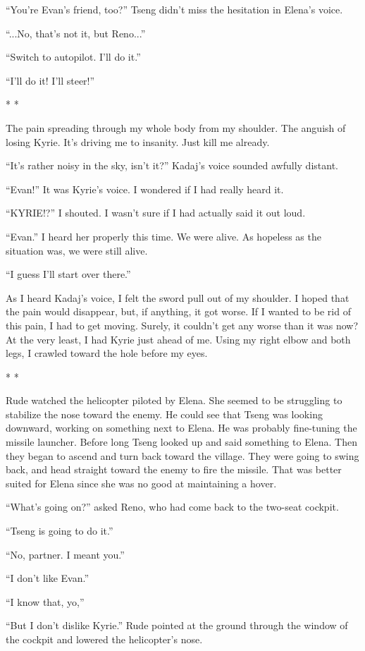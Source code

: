 \documentclass[oneside]{book}
\begin{document}
“You’re Evan’s friend, too?” Tseng didn’t miss the hesitation in Elena’s voice.

“...No, that’s not it, but Reno...”

“Switch to autopilot. I’ll do it.”

“I’ll do it! I’ll steer!”

* *

The pain spreading through my whole body from my shoulder. The anguish of losing Kyrie. It’s driving me to insanity. Just kill me already.

“It’s rather noisy in the sky, isn’t it?” Kadaj’s voice sounded awfully distant.

“Evan!” It was Kyrie’s voice. I wondered if I had really heard it.

“KYRIE!?” I shouted. I wasn’t sure if I had actually said it out loud.

“Evan.” I heard her properly this time. We were alive. As hopeless as the situation was, we were still alive.

“I guess I’ll start over there.”

As I heard Kadaj’s voice, I felt the sword pull out of my shoulder. I hoped that the pain would disappear, but, if anything, it got worse. If I wanted to be rid of this pain, I had to get moving. Surely, it couldn’t get any worse than it was now? At the very least, I had Kyrie just ahead of me. Using my right elbow and both legs, I crawled toward the hole before my eyes.

* *

Rude watched the helicopter piloted by Elena. She seemed to be struggling to stabilize the nose toward the enemy. He could see that Tseng was looking downward, working on something next to Elena. He was probably fine-tuning the missile launcher. Before long Tseng looked up and said something to Elena. Then they began to ascend and turn back toward the village. They were going to swing back, and head straight toward the enemy to fire the missile. That was better suited for Elena since she was no good at maintaining a hover.

“What’s going on?” asked Reno, who had come back to the two-seat cockpit.

“Tseng is going to do it.”

“No, partner. I meant you.”

“I don’t like Evan.”

“I know that, yo,”

“But I don’t dislike Kyrie.” Rude pointed at the ground through the window of the cockpit and lowered the helicopter’s nose.
\end{document}
